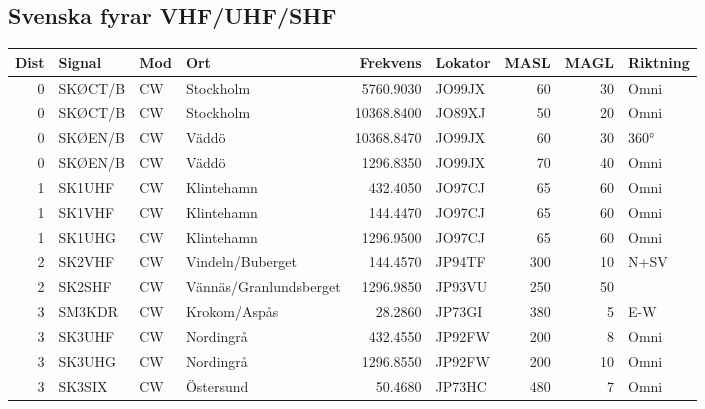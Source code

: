 {\begin{landscape}
\subsection{Svenska fyrar VHF/UHF/SHF}
\begin{longtable}{rlllrlrrl}
	          \bf Dist & \bf Signal & \bf Mod & \bf Ort                & \bf Frekvens & \bf Lokator & \bf MASL & \bf MAGL & \bf Riktning \\ \hline
	\endhead
	                 0 & SKØCT/B    & CW      & Stockholm              &    5760.9030 & JO99JX      &       60 &       30 & Omni         \\
	                 0 & SKØCT/B    & CW      & Stockholm              &   10368.8400 & JO89XJ      &       50 &       20 & Omni         \\
	                 0 & SKØEN/B    & CW      & Väddö                  &   10368.8470 & JO99JX      &       60 &       30 & 360°         \\
	                 0 & SKØEN/B    & CW      & Väddö                  &    1296.8350 & JO99JX      &       70 &       40 & Omni         \\
	                 1 & SK1UHF     & CW      & Klintehamn             &     432.4050 & JO97CJ      &       65 &       60 & Omni         \\
	                 1 & SK1VHF     & CW      & Klintehamn             &     144.4470 & JO97CJ      &       65 &       60 & Omni         \\
	                 1 & SK1UHG     & CW      & Klintehamn             &    1296.9500 & JO97CJ      &       65 &       60 & Omni         \\
	                 2 & SK2VHF     & CW      & Vindeln/Buberget       &     144.4570 & JP94TF      &      300 &       10 & N+SV         \\
	                 2 & SK2SHF     & CW      & Vännäs/Granlundsberget &    1296.9850 & JP93VU      &      250 &       50 &              \\
	                 3 & SM3KDR     & CW      & Krokom/Aspås           &      28.2860 & JP73GI      &      380 &        5 & E-W          \\
	                 3 & SK3UHF     & CW      & Nordingrå              &     432.4550 & JP92FW      &      200 &        8 & Omni         \\
	                 3 & SK3UHG     & CW      & Nordingrå              &    1296.8550 & JP92FW      &      200 &       10 & Omni         \\
	                 3 & SK3SIX     & CW      & Östersund              &      50.4680 & JP73HC      &      480 &        7 & Omni         \\

\end{longtable}
\end{landscape}}
